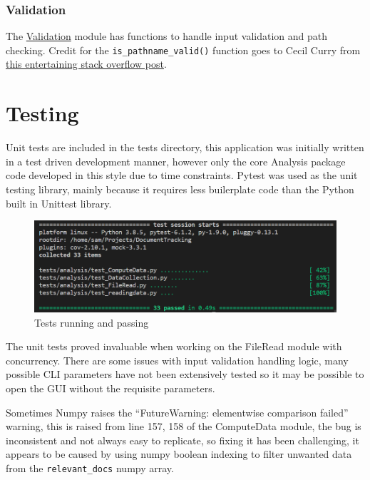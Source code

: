 \documentclass[11pt]{article}
\newcommand{\code}[1]{\colorbox{light-gray}{\texttt{#1}}}
\begin{document}
\subsubsection{Validation}
The \href{https://www2.macs.hw.ac.uk/~sf52/DocuTrace/html/DocuTrace.Utils.html#module-DocuTrace.Utils.Validation}{Validation} module has functions to handle input validation and path checking. Credit for the \code{is\_pathname\_valid()} function goes to Cecil Curry from \href{https://stackoverflow.com/questions/9532499/check-whether-a-path-is-valid-in-python-without-creating-a-file-at-the-paths-ta}{this entertaining stack overflow post}\autocite{FilesystemsCheckWhether}.


\section{Testing}

Unit tests are included in the tests directory, this application was initially written in a test driven development manner, however only the core Analysis package code developed in this style due to time constraints. Pytest was used as the unit testing library, mainly because it requires less builerplate code than the Python built in Unittest library.

\begin{figure}[h]
    \includegraphics{pytest.png}
    \caption{Tests running and passing}
    \label{fig:pytest}
\end{figure}

The unit tests proved invaluable when working on the FileRead module with concurrency.
There are some issues with input validation handling logic, many possible CLI parameters have not been extensively tested so it may be possible to open the GUI without the requisite parameters. 

Sometimes Numpy raises the ``FutureWarning: elementwise comparison failed'' warning, this is raised from line 157, 158 of the ComputeData module, the bug is inconsistent and not always easy to replicate, so fixing it has been challenging, it appears to be caused by using numpy boolean indexing to filter unwanted data from the \code{relevant\_docs} numpy array.
\end{document}
